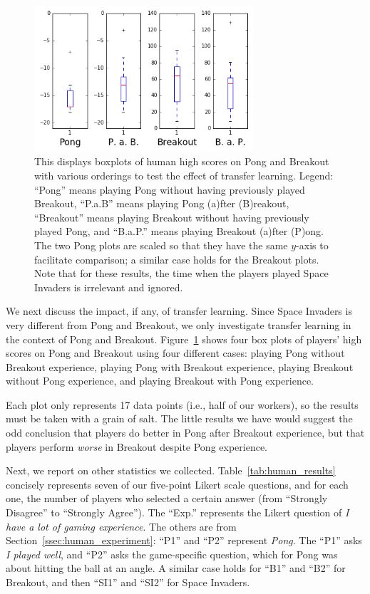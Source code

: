 \documentclass[letterpaper, 10 pt, conference]{ieeeconf}  %
\begin{document}
\begin{figure}[t]
\centering
\includegraphics[width=3.2in]{fig_boxplots_transfer_learning}
\caption{This displays boxplots of human high scores on Pong and Breakout with various orderings to
test the effect of transfer learning. Legend: ``Pong'' means playing Pong without having previously
played Breakout, ``P.a.B'' means playing Pong (a)fter (B)reakout, ``Breakout'' means playing
Breakout without having previously played Pong, and ``B.a.P.'' means playing Breakout (a)fter
(P)ong. The two Pong plots are scaled so that they have the same $y$-axis to facilitate comparison;
a similar case holds for the Breakout plots. Note that for these results, the time when the players
played Space Invaders is irrelevant and ignored.}
\label{fig:human_transfer}
\end{figure}

We next discuss the impact, if any, of transfer learning. Since Space Invaders is very different
from Pong and Breakout, we only investigate transfer learning in the context of Pong and Breakout.
Figure~\ref{fig:human_transfer} shows four box plots of players' high scores on Pong and Breakout
using four different cases: playing Pong without Breakout experience, playing Pong with Breakout
experience, playing Breakout without Pong experience, and playing Breakout with Pong experience.

Each plot only represents 17 data points (i.e., half of our workers), so the results must be taken
with a grain of salt. The little results we have would suggest the odd conclusion that players do
better in Pong after Breakout experience, but that players perform \emph{worse} in Breakout despite
Pong experience.

Next, we report on other statistics we collected. Table~\ref{tab:human_results} concisely represents
seven of our five-point Likert scale questions, and for each one, the number of players who selected
a certain answer (from ``Strongly Disagree'' to ``Strongly Agree''). The ``Exp.'' represents the
Likert question of \emph{I have a lot of gaming experience}. The others are from
Section~\ref{ssec:human_experiment}: ``P1'' and ``P2'' represent \emph{Pong}. The ``P1'' asks
\emph{I played well}, and ``P2'' asks the game-specific question, which for Pong was about hitting
the ball at an angle. A similar case holds for ``B1'' and ``B2'' for Breakout, and then ``SI1'' and
``SI2'' for Space Invaders.
\end{document}
